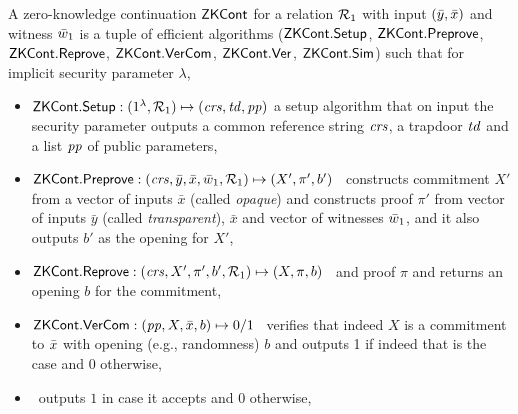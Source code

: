 \begin{definition}[ZK Continuations]
\label{def:zk_cont}
 A zero-knowledge continuation ${\mathsf{ZKCont}}$ for a relation $\mathcal{R}_1$ with 
input $(\bar{y}, \bar{x})$ and witness $\bar{w}_1$ is a tuple of efficient algorithms 
(${\mathsf{ZKCont}}.{\mathsf{Setup}}$, ${\mathsf{ZKCont}}.{\mathsf{Preprove}}$, ${\mathsf{ZKCont}}.{\mathsf{Reprove}}$, ${\mathsf{ZKCont}}.{\mathsf{VerCom}}$, ${\mathsf{ZKCont}}.{\mathsf{Ver}}$, ${\mathsf{ZKCont}}.{\mathsf{Sim}}$) 
such that for implicit security parameter $\lambda$,
\begin{itemize}

\item ${\mathsf{ZKCont}}.{\mathsf{Setup}}: (1^{\lambda}, \mathcal{R}_1) \mapsto (\mathit{crs}, \mathit{td}, \mathit{pp})$ a setup algorithm that on input the security parameter 
outputs a common reference string $\mathit{crs}$, a trapdoor $\mathit{td}$ and a list $\mathit{pp}$ of public parameters, 


\item ${\mathsf{ZKCont}}.{\mathsf{Preprove}}: (\mathit{crs}, \bar{y}, \bar{x}, \bar{w}_1, \mathcal{R}_1) \mapsto (X', \pi', b')$ \,
constructs commitment $X'$ from a vector of inputs $\bar{x}$ (called \emph{opaque}) and 
constructs proof $\pi'$ from vector of inputs 
$\bar{y}$ (called \emph{transparent}), $\bar{x}$ and vector of witnesses $\bar{w}_1$, and it 
also outputs $b'$ as the opening for $X'$,

\item ${\mathsf{ZKCont}}.{\mathsf{Reprove}}: (\mathit{crs}, X', \pi', b', \mathcal{R}_1) \mapsto (X, \pi, b)$ \,
 and proof $\pi$ and returns an opening $b$ for the commitment, 

\item ${\mathsf{ZKCont}}.{\mathsf{VerCom}}: (\mathit{pp}, X, \bar{x}, b) \mapsto 0/1$ \, 
verifies that indeed $X$ is a commitment to $\bar{x}$ with opening (e.g., randomness) $b$ and 
outputs 1 if indeed that is the case and 0 otherwise,
 
\item {} \, outputs $1$ in case it accepts  and $0$ otherwise,


\end{itemize}
\end{definition}
